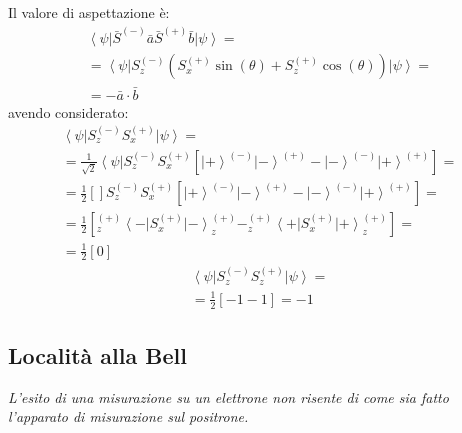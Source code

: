 Il valore di aspettazione è:
\begin{equation}\begin{split}
\left\langle \psi \right |\bar S^{\left(-\right)}\bar a\bar S^{\left(+\right)}\bar b\left |\psi  \right\rangle=\\
=\left\langle \psi \right |S_z^{\left(-\right)}\left(S_x^{\left(+\right)}\sin{\left(\theta\right)}+S_z^{\left(+\right)}\cos{\left(\theta\right)}\right)\left |\psi  \right\rangle=\\
=-\bar a\cdot \bar b
\end{split}\end{equation}
avendo considerato:
\begin{equation}\begin{split}
\left\langle \psi \right |S_z^{\left(-\right)}S_x^{\left(+\right)}\left |\psi  \right\rangle=\\
=\frac{1}{\sqrt{2}}\left\langle \psi \right |S_z^{\left(-\right)}S_x^{\left(+\right)}\left[\left |+ \right\rangle^{\left(-\right)}\left |- \right\rangle^{\left(+\right)}-\left |- \right\rangle^{\left(-\right)}\left |+ \right\rangle^{\left(+\right)}\right]=\\
=\frac{1}{2}\left[\right]S_z^{\left(-\right)}S_x^{\left(+\right)}\left[\left |+ \right\rangle^{\left(-\right)}\left |- \right\rangle^{\left(+\right)}-\left |- \right\rangle^{\left(-\right)}\left |+ \right\rangle^{\left(+\right)}\right]=\\
=\frac{1}{2}\left[_z^{\left(+\right)}\left\langle -\right |S_x^{\left(+\right)}\left |- \right\rangle_z^{\left(+\right)}-_z^{\left(+\right)}\left\langle +\right |S_x^{\left(+\right)}\left |+ \right\rangle_z^{\left(+\right)}\right]=\\
=\frac{1}{2}\left[0\right]
\end{split}\end{equation}
\begin{equation}\begin{split}
\left\langle \psi \right |S_z^{\left(-\right)}S_z^{\left(+\right)}\left |\psi  \right\rangle=\\
=\frac{1}{2}\left[-1-1\right]=-1
\end{split}\end{equation}

\subsection{Località alla Bell} %
\emph{L'esito di una misurazione su un elettrone non risente di come sia fatto l'apparato di misurazione sul positrone.}

